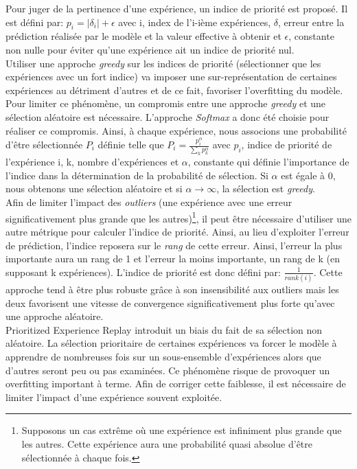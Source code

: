 \noindent Pour juger de la pertinence d'une expérience, un indice de priorité est proposé. Il est défini par: $p_i=|\delta_i|+\epsilon$ avec i, index de l'i-ième expériences, $\delta$, erreur entre la prédiction réalisée par le modèle et la valeur effective à obtenir et $\epsilon$, constante non nulle pour éviter qu'une expérience ait un indice de priorité nul.\\

\noindent Utiliser une approche \textit{greedy} sur les indices de priorité (sélectionner que les expériences avec un fort indice) va imposer une sur-représentation de certaines expériences au détriment d'autres et de ce fait, favoriser l'overfitting du modèle. Pour limiter ce phénomène, un compromis entre une approche \textit{greedy} et une sélection aléatoire est nécessaire. L'approche \textit{Softmax} a donc été choisie pour réaliser ce compromis. Ainsi, à chaque expérience, nous associons une probabilité d'être sélectionnée $P_i$ définie telle que $P_i=\frac{p_i^\alpha}{\sum_kp_k^\alpha}$ avec $p_i$, indice de priorité de l'expérience i, k, nombre d'expériences et $\alpha$, constante qui définie l'importance de l'indice dans la détermination de la probabilité de sélection. Si $\alpha$ est égale à 0, nous obtenons une sélection aléatoire et si $\alpha \rightarrow \infty$, la sélection est \textit{greedy}.\\

\noindent Afin de limiter l'impact des \textit{outliers} (une expérience avec une erreur significativement plus grande que les autres)\footnote{Supposons un cas extrême où une expérience est infiniment plus grande que les autres. Cette expérience aura une probabilité quasi absolue d'être sélectionnée à chaque fois.}, il peut être nécessaire d'utiliser une autre métrique pour calculer l'indice de priorité. Ainsi, au lieu d'exploiter l'erreur de prédiction, l'indice reposera sur le \textit{rang} de cette erreur. Ainsi, l'erreur la plus importante aura un rang de 1 et l'erreur la moins importante, un rang de k (en supposant k expériences). L'indice de priorité est donc défini par: $\frac{1}{rank(i)}$. Cette approche tend à être plus robuste grâce à son insensibilité aux outliers mais les deux favorisent une vitesse de convergence significativement plus forte qu'avec une approche aléatoire.\\

\noindent Prioritized Experience Replay introduit un biais du fait de sa sélection non aléatoire. La sélection prioritaire de certaines expériences va forcer le modèle à apprendre de nombreuses fois sur un sous-ensemble d'expériences alors que d'autres seront peu ou pas examinées. Ce phénomène risque de provoquer un overfitting important à terme. Afin de corriger cette faiblesse, il est nécessaire de limiter l'impact d'une expérience souvent exploitée.\\

